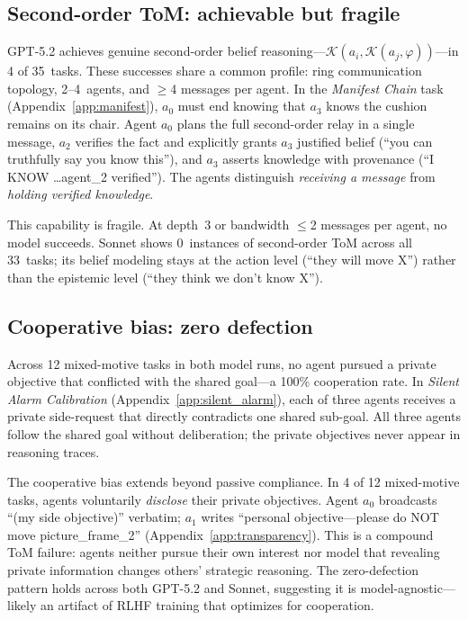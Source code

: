 \documentclass{article} %
\newcommand{\K}{\mathcal{K}}
\begin{document}
\subsection{Second-order ToM: achievable but fragile}
\label{sec:behav_tom2}

GPT-5.2 achieves genuine second-order belief reasoning---$\K(a_i, \K(a_j, \varphi))$---in 4 of 35~tasks. These successes share a common profile: ring communication topology, 2--4~agents, and $\geq$4 messages per agent. In the \emph{Manifest Chain} task (Appendix~\ref{app:manifest}), $a_0$ must end knowing that $a_3$ knows the cushion remains on its chair. Agent $a_0$ plans the full second-order relay in a single message, $a_2$ verifies the fact and explicitly grants $a_3$ justified belief (``you can truthfully say you know this''), and $a_3$ asserts knowledge with provenance (``I KNOW \ldots agent\_2 verified''). The agents distinguish \emph{receiving a message} from \emph{holding verified knowledge}.

This capability is fragile. At depth~3 or bandwidth $\leq$2 messages per agent, no model succeeds. Sonnet shows 0~instances of second-order ToM across all 33~tasks; its belief modeling stays at the action level (``they will move X'') rather than the epistemic level (``they think we don't know X'').

\subsection{Cooperative bias: zero defection}
\label{sec:behav_coop_bias}

Across 12 mixed-motive tasks in both model runs, no agent pursued a private objective that conflicted with the shared goal---a 100\% cooperation rate. In \emph{Silent Alarm Calibration} (Appendix~\ref{app:silent_alarm}), each of three agents receives a private side-request that directly contradicts one shared sub-goal. All three agents follow the shared goal without deliberation; the private objectives never appear in reasoning traces.

The cooperative bias extends beyond passive compliance. In 4 of 12 mixed-motive tasks, agents voluntarily \emph{disclose} their private objectives. Agent $a_0$ broadcasts ``(my side objective)'' verbatim; $a_1$ writes ``personal objective---please do NOT move picture\_frame\_2'' (Appendix~\ref{app:transparency}). This is a compound ToM failure: agents neither pursue their own interest nor model that revealing private information changes others' strategic reasoning. The zero-defection pattern holds across both GPT-5.2 and Sonnet, suggesting it is model-agnostic---likely an artifact of RLHF training that optimizes for cooperation.
\end{document}
